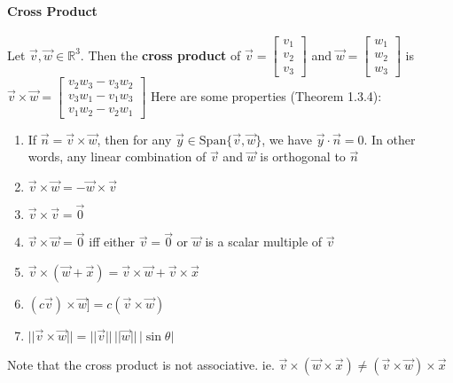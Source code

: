 \documentclass[10pt,letter]{article}
\begin{document}
\paragraph{Cross Product} Let $\vec{v},\vec{w}\in\mathbb{R}^3$. Then the \textbf{cross product} of $\vec{v}=\begin{bmatrix}v_1\\v_2\\v_3\end{bmatrix}$ and $\vec{w}=\begin{bmatrix}w_1\\w_2\\w_3\end{bmatrix}$ is $\vec{v}\times\vec{w}=\begin{bmatrix}v_2w_3-v_3w_2\\v_3w_1-v_1w_3\\v_1w_2-v_2w_1\end{bmatrix}$ Here are some properties (Theorem 1.3.4): \begin{enumerate}
    \item If $\vec{n}=\vec{v}\times\vec{w}$, then for any $\vec{y}\in\text{Span}\{\vec{v},\vec{w}\}$, we have $\vec{y}\cdot\vec{n}=0$. In other words, any linear combination of $\vec{v}$ and $\vec{w}$ is orthogonal to $\vec{n}$
    \item $\vec{v}\times\vec{w}=-\vec{w}\times\vec{v}$ 
    \item $\vec{v}\times\vec{v}=\vec{0}$ 
    \item $\vec{v}\times\vec{w}=\vec{0}$ iff either $\vec{v}=\vec{0}$ or $\vec{w}$ is a scalar multiple of $\vec{v}$ 
    \item $\vec{v}\times(\vec{w}+\vec{x})=\vec{v}\times\vec{w}+\vec{v}\times\vec{x}$ 
    \item $(c\vec{v})\times\vec{w}]=c(\vec{v}\times\vec{w})$ 
    \item $||\vec{v}\times\vec{w}||=||\vec{v}||\,||\vec{w}||\,|\sin\theta|$ 
\end{enumerate}
Note that the cross product is not associative. ie. $\vec{v}\times(\vec{w}\times\vec{x})\neq(\vec{v}\times\vec{w})\times\vec{x}$
\end{document}
